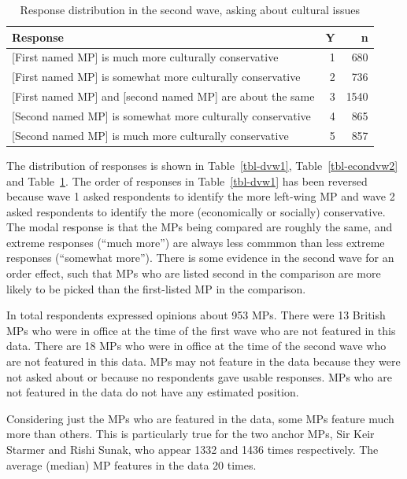 \documentclass[
]{article}
\begin{document}
\begin{longtable}[]{@{}lrr@{}}

\caption{\label{tbl-cultdvw2}Response distribution in the second wave,
asking about cultural issues}

\tabularnewline

\toprule\noalign{}
Response & Y & n \\
\midrule\noalign{}
\endhead
\bottomrule\noalign{}
\endlastfoot
{[}First named MP{]} is much more culturally conservative & 1 & 680 \\
{[}First named MP{]} is somewhat more culturally conservative & 2 &
736 \\
{[}First named MP{]} and {[}second named MP{]} are about the same & 3 &
1540 \\
{[}Second named MP{]} is somewhat more culturally conservative & 4 &
865 \\
{[}Second named MP{]} is much more culturally conservative & 5 & 857 \\

\end{longtable}

The distribution of responses is shown in Table~\ref{tbl-dvw1},
Table~\ref{tbl-econdvw2} and Table~\ref{tbl-cultdvw2}. The order of
responses in Table~\ref{tbl-dvw1} has been reversed because wave 1 asked
respondents to identify the more left-wing MP and wave 2 asked
respondents to identify the more (economically or socially)
conservative. The modal response is that the MPs being compared are
roughly the same, and extreme responses (``much more'') are always less
commmon than less extreme responses (``somewhat more''). There is some
evidence in the second wave for an order effect, such that MPs who are
listed second in the comparison are more likely to be picked than the
first-listed MP in the comparison.

In total respondents expressed opinions about 953 MPs. There were 13
British MPs who were in office at the time of the first wave who are not
featured in this data. There are 18 MPs who were in office at the time
of the second wave who are not featured in this data. MPs may not
feature in the data because they were not asked about or because no
respondents gave usable responses. MPs who are not featured in the data
do not have any estimated position.

Considering just the MPs who are featured in the data, some MPs feature
much more than others. This is particularly true for the two anchor MPs,
Sir Keir Starmer and Rishi Sunak, who appear 1332 and 1436 times
respectively. The average (median) MP features in the data 20 times.
\end{document}
